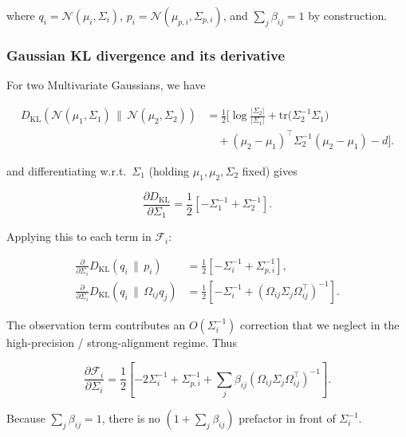 \documentclass[11pt]{article}
\begin{document}
where $q_i = \mathcal{N}(\mu_i, \Sigma_i)$, $p_i = \mathcal{N}(\mu_{p,i}, \Sigma_{p,i})$, and $\sum_j \beta_{ij} = 1$ by construction.

\subsubsection{Gaussian KL divergence and its derivative}

For two Multivariate Gaussians, we have 

\begin{align}
D_{\mathrm{KL}}\!\left(
\mathcal{N}(\mu_1, \Sigma_1)
\,\|\, 
\mathcal{N}(\mu_2, \Sigma_2)
\right)
&=
\frac{1}{2}
\Big[
\log \frac{|\Sigma_2|}{|\Sigma_1|}
+ \mathrm{tr}\!\big(\Sigma_2^{-1}\Sigma_1\big)
\\ &\quad
+ (\mu_2 - \mu_1)^\top
  \Sigma_2^{-1}
  (\mu_2 - \mu_1)
- d
\Big].
\label{eq:gaussian_KL}
\end{align}


and differentiating w.r.t.\ $\Sigma_1$ (holding $\mu_1,\mu_2,\Sigma_2$ fixed) gives

\begin{equation}
\frac{\partial D_{\mathrm{KL}}}{\partial \Sigma_1}
=\frac{1}{2}\left[
-\Sigma_1^{-1}
+ \Sigma_2^{-1}
\right].
\end{equation}

Applying this to each term in $\mathcal{F}_i$:

\begin{align}
\frac{\partial}{\partial \Sigma_i}
D_{\mathrm{KL}}(q_i \,\|\, p_i)
&=\frac{1}{2}\left[
-\Sigma_i^{-1}
+ \Sigma_{p,i}^{-1}
\right],
\\[6pt]
\frac{\partial}{\partial \Sigma_i}
D_{\mathrm{KL}}(q_i \,\|\, \Omega_{ij} q_j)
&=
\frac{1}{2}\left[
-\Sigma_i^{-1}
+ (\Omega_{ij}\Sigma_j\Omega_{ij}^\top)^{-1}
\right].
\end{align}

The observation term contributes an $O(\Sigma_i^{-1})$ correction that we neglect in the high-precision / strong-alignment regime. Thus

\begin{equation}
\boxed{
\frac{\partial \mathcal{F}_i}{\partial \Sigma_i}
=\frac{1}{2}
\left[
-2 \Sigma_i^{-1}
+ \Sigma_{p,i}^{-1}
+ \sum_j \beta_{ij}
(\Omega_{ij}\Sigma_j\Omega_{ij}^\top)^{-1}
\right].
}
\label{eq:Sigma_gradient_final}
\end{equation}

Because $\sum_j \beta_{ij} = 1$, there is no $(1 + \sum_j \beta_{ij})$ prefactor in front of $\Sigma_i^{-1}$.
\end{document}
